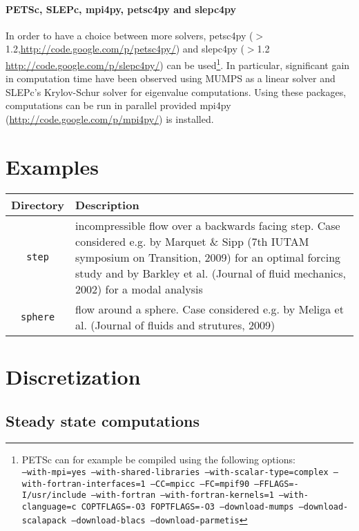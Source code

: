 \documentclass[12pts]{article}%
\begin{document}
\paragraph{PETSc, SLEPc, mpi4py, petsc4py and slepc4py} In order to
have a choice between more solvers, petsc4py
($>$1.2,\url{http://code.google.com/p/petsc4py/}) and slepc4py ($>$1.2
\url{http://code.google.com/p/slepc4py/}) can be used\footnote{PETSc
  can for example be compiled using the following options:
  \\\texttt{--with-mpi=yes --with-shared-libraries
    --with-scalar-type=complex --with-fortran-interfaces=1 --CC=mpicc
    --FC=mpif90 --FFLAGS=-I/usr/include --with-fortran
    --with-fortran-kernels=1 --with-clanguage=c COPTFLAGS=-O3
    FOPTFLAGS=-O3 --download-mumps --download-scalapack
    --download-blacs --download-parmetis}}. In particular, significant
gain in computation time have been observed using MUMPS as a linear
solver and SLEPc's Krylov-Schur solver for eigenvalue
computations. Using these packages, computations can be run in
parallel provided mpi4py (\url{http://code.google.com/p/mpi4py/}) is
installed.

\section{Examples}

\begin{center}
\begin{tabular}{c|p{10cm}}
  Directory & Description \\ \hline \hline
  \texttt{step}   & incompressible flow over a backwards facing
  step. Case considered e.g. by Marquet \& Sipp (7th IUTAM symposium on
  Transition, 2009) for an optimal forcing study and by Barkley et al. (Journal of fluid mechanics, 2002) for a modal analysis\\
  \texttt{sphere} & flow around a sphere. Case  considered e.g. by Meliga et al. (Journal of fluids and strutures, 2009)
\end{tabular}
\end{center}

\section{Discretization}

\subsection{Steady state computations}
\end{document}
